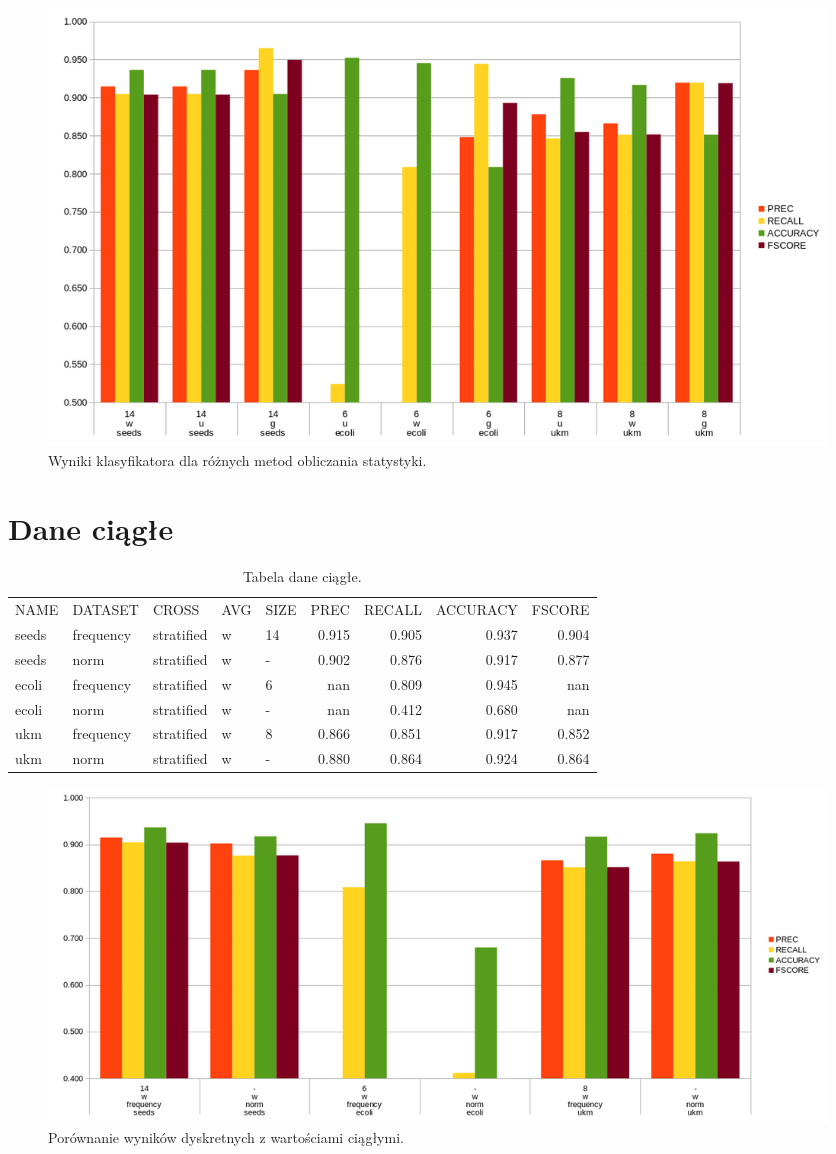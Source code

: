 \begin{figure}[H]
	\centering
		\includegraphics[width=1.0\linewidth]{stats.png}
	\caption[Wyniki klasyfikatora dla różnych metod obliczania statystyki.]{Wyniki klasyfikatora dla różnych metod obliczania statystyki.}
	\label{fig:stats}
\end{figure}

\section{Dane ciągłe}

\begin{table}[H]
\centering
\caption{Tabela dane ciągłe.}
\label{table-norm}
\begin{tabular}{lllllrrrr}
NAME  & DATASET   & CROSS      & AVG & SIZE & PREC  & RECALL & ACCURACY & FSCORE \\
seeds & frequency & stratified & w   & 14   & 0.915 & 0.905  & 0.937    & 0.904  \\
seeds & norm      & stratified & w   & -    & 0.902 & 0.876  & 0.917    & 0.877  \\
ecoli & frequency & stratified & w   & 6    & nan   & 0.809  & 0.945    & nan    \\
ecoli & norm      & stratified & w   & -    & nan   & 0.412  & 0.680    & nan    \\
ukm   & frequency & stratified & w   & 8    & 0.866 & 0.851  & 0.917    & 0.852  \\
ukm   & norm      & stratified & w   & -    & 0.880 & 0.864  & 0.924    & 0.864 
\end{tabular}
\end{table}

\begin{figure}[H]
	\centering
		\includegraphics[width=1.0\linewidth]{norm.png}
	\caption[Porównanie wyników dyskretnych z wartościami ciągłymi.]{Porównanie wyników dyskretnych z wartościami ciągłymi.}
	\label{fig:norm}
\end{figure}